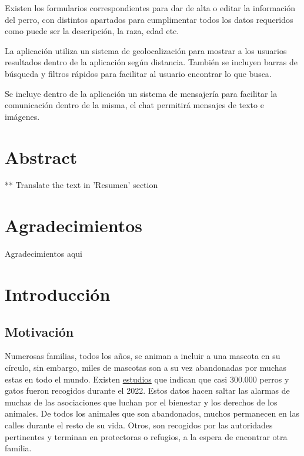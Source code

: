 \documentclass[a4paper, 12pt]{article}
\begin{document}
Existen los formularios correspondientes para dar de alta o editar la información del perro, con distintos apartados para cumplimentar todos los datos requeridos como puede ser la descripción, la raza, edad etc. 

La aplicación utiliza un sistema de geolocalización para mostrar a los usuarios resultados dentro de la aplicación según distancia. También se incluyen barras de búsqueda y filtros rápidos para facilitar al usuario encontrar lo que busca.

Se incluye dentro de la aplicación un sistema de mensajería para facilitar la comunicación dentro de la misma, el chat permitirá mensajes de texto e imágenes. 


\newpage
\pagestyle{plain}
\thispagestyle{empty}
\mbox{}

\newpage
\section*{Abstract}
** Translate the text in 'Resumen' section

\newpage
\thispagestyle{empty}
\mbox{}

\newpage
\section*{Agradecimientos}
\begin{center} 
\vspace*{\fill}
Agradecimientos aqui
\vspace*{\fill}
\end{center} 

\newpage
\thispagestyle{empty}
\mbox{}
\newpage
\thispagestyle{empty}
\mbox{}

\tableofcontents

\newpage
\thispagestyle{empty}
\mbox{}

\newpage
\section{Introducción}

\subsection{Motivación}
Numerosas familias, todos los años, se animan a incluir a una mascota en su círculo, sin embargo, miles de mascotas son a su vez abandonadas por muchas estas en todo el mundo. Existen \href{https://www.fundacion-affinity.org/perros-gatos-y-personas/busco-un-animal-de-compania/las-cifras-del-abandono-de-perros-y-gatos-aun}{estudios} que indican que casi 300.000 perros y gatos fueron recogidos durante el 2022. Estos datos hacen saltar las alarmas de muchas de las asociaciones que luchan por el bienestar y los derechos de los animales. De todos los animales que son abandonados, muchos permanecen en las calles durante el resto de su vida. Otros, son recogidos por las autoridades pertinentes y terminan en protectoras o refugios, a la espera de encontrar otra familia. 
\end{document}
